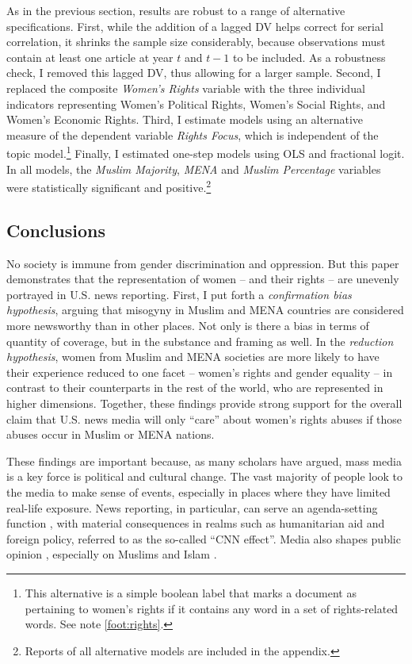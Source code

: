 \documentclass[11pt, oneside]{article}
\begin{document}
As in the previous section, results are robust to a range of alternative specifications. First, while the addition of a lagged DV helps correct for serial correlation, it shrinks the sample size considerably, because observations must contain at least one article at year $t$ and $t-1$ to be included. As a robustness check, I removed this lagged DV, thus allowing for a larger sample. Second, I replaced the composite \emph{Women's Rights} variable with the three individual indicators representing Women's Political Rights, Women's Social Rights, and Women's Economic Rights. Third, I estimate models using an alternative measure of the dependent variable \emph{Rights Focus}, which is independent of the topic model.\footnote{\hspace{5}This alternative is a simple boolean label that marks a document as pertaining to women's rights if it contains any word in a set of rights-related words. See note \ref{foot:rights}.} Finally, I estimated one-step models using OLS and fractional logit. In all models,  the \emph{Muslim Majority}, \emph{MENA} and \emph{Muslim Percentage} variables were statistically significant and positive.\footnote{\hspace{5}Reports of all alternative models are included in the appendix.}

\subsection{Conclusions}

No society is immune from gender discrimination and oppression. But this paper demonstrates that the representation of women -- and their rights -- are unevenly portrayed in U.S. news reporting. First, I put forth a \emph{confirmation bias hypothesis}, arguing that misogyny in Muslim and MENA countries are considered more newsworthy than in other places. Not only is there a bias in terms of quantity of coverage, but in the substance and framing as well. In the \emph{reduction hypothesis}, women from Muslim and MENA societies are more likely to have their experience reduced to one facet -- women's rights and gender equality -- in contrast to their counterparts in the rest of the world, who are represented in higher dimensions. Together, these findings provide strong support for the overall claim that U.S. news media will only ``care'' about women's rights abuses if those abuses occur in Muslim or MENA nations. 

These findings are important because, as many scholars have argued, mass media is a key force is political and cultural change. The vast majority of people look to the media to make sense of events, especially in places where they have limited real-life exposure. News reporting, in particular, can serve an agenda-setting function \cite{mccombs_agenda-setting_1972}, with material consequences in realms such as humanitarian aid and foreign policy, referred to as the so-called ``CNN effect''\cite {robinson_cnn_1999,robinson_theorizing_2001,baum_relationships_2008}. Media also shapes public opinion \cite{gamson1989media,kinder_communication_1998}, especially on Muslims and Islam \cite{bail2012fringe,mcalister_epic_2001,said_covering_2008}. 
\end{document}
